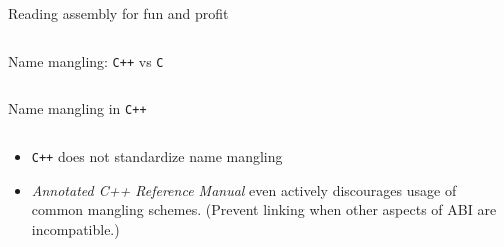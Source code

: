 \begin{frame}[fragile]{Reading assembly for fun and profit}
    \begin{columns}[t]
        \begin{column}{.45\textwidth}
        \end{column}
        \begin{column}{.45\textwidth}
        \end{column}
    \end{columns}
\end{frame}

\begin{frame}[fragile]{Name mangling: \texttt{C++} vs \texttt{C}}
    \begin{columns}[t]
        \begin{column}{.45\textwidth}

        \end{column}
        \begin{column}{.45\textwidth}
        \end{column}
    \end{columns}
\end{frame}

\begin{frame}[fragile]{Name mangling in \texttt{C++}}
    \begin{columns}[t]
        \begin{column}{.45\textwidth}
        \end{column}
        \begin{column}{.45\textwidth}
        \end{column}
    \end{columns}

    \begin{itemize}
        \item \texttt{C++} does not standardize name mangling
        \item \textit{Annotated C++ Reference Manual} even actively discourages usage of common mangling schemes. (Prevent linking when other aspects of ABI are incompatible.) 
    \end{itemize}
\end{frame}

